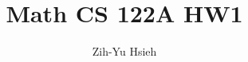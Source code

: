 \documentclass{article}
\title{Math CS 122A HW1}
\author{Zih-Yu Hsieh}
\newtheorem{question}{Question}
\begin{document}
\maketitle

\begin{comment}
\section*{1 (Unsolved)}
\begin{question}
    \textbf{Ahlfors Pg. 9 Problem 5}
\end{question}

\hfill

\textbf{Pf:}

\break


\section*{2}
\begin{question}
    \textbf{Ahlfors Pg. 11 Problem 1
    }
\end{question}

\hfill

\textbf{Pf:}

Suppose $a,b\in\mathbb{C}$ satisfy $|a|,|b| <1$. Then, since $|\bar{a}b| = |\bar{a}|\cdot |b| = |a|\cdot |b| <1$,
$|\bar{a}b| \neq |1| = 1$, then $\bar{a}b \neq 1$.
So, $1-\bar{a}b \neq 0$, the term $\frac{a-b}{1-\bar{a}b}$ is defined.

Now, consider the following identity:
$$\forall x,y\in \mathbb{C},\quad |x-y|^2 = |x|^2+|y|^2 - 2 Re(x\bar{y})$$
So, the following equations are true:
$$|a-b|^2 = |a|^2+|b|^2-2Re(a\bar{b})$$
$$|1-\bar{a}b|^2 = |1|^2+|\bar{a}b|^2-2Re(\bar{a}b)$$
Which, $|\bar{a}b| = |\bar{a}|\cdot|b| = |a|\cdot|b|$, and $Re(\bar{a}b) = \frac{\bar{a}b + \overline{\bar{a}b}}{2} = \frac{\bar{a}b + a\bar{b}}{2} = Re(a\bar{b})$,
so the equation can be simplified to:
$$|1-\bar{a}b|^2 = 1+|a|^2\cdot|b|^2-2Re(a\bar{b})$$

Then, consider the term $(1+|a|^2\cdot|b|^2)-(|a|^2+|b|^2)$:
$$(1+|a|^2\cdot|b|^2)-(|a|^2+|b|^2) = (1-|b|^2)+|a|^2(|b|^2-1)$$
$$ = (1-|b|^2)-|a|^2(1-|b|^2)=(1-|a|^2)(1-|b|^2)$$
Since both $|a|,|b|<1$, then $|a|^2,|b|^2 <1$, which $(1-|a|^2),(1-|b|^2)>0$. 
Hence, we can conclude that $(1+|a|^2\cdot|b|^2)-(|a|^2+|b|^2) = (1-|a|^2)(1-|b|^2) >0$, which: 
$$(1+|a|^2\cdot|b|^2) > (|a|^2+|b|^2),\quad (1+|a|^2\cdot|b|^2-2Re(a\bar{b})) > (|a|^2+|b|^2-2Re(a\bar{b}))$$
Replace the terms with the original form of absolute value, we get:
$$|1-\bar{a}b|^2 > |a-b|^2$$
Because $(1-\bar{a}b)\neq 0$, then $|1-\bar{a}b|^2 >0$. So:
$$1 > \frac{|a-b|^2}{|1-\bar{a}b|^2} = \left|\frac{a-b}{1-\bar{a}b}\right|^2,\quad \left|\frac{a-b}{1-\bar{a}b}\right| <1$$
Which the inequality is true.


\end{comment}
\end{document}
